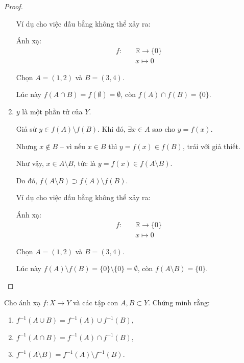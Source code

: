 \documentclass[class=linearalgebra,crop=false]{standalone}
\begin{document}
\begin{proof}
\begin{enumerate}[label = (\alph*)]
        \bigskip
        \par Ví dụ cho việc dấu bằng không thể xảy ra:
        \par Ánh xạ:
        \begin{align*}
            f:\quad& \mathbb{R}\rightarrow \{0\} \\
                   & x\mapsto 0
        \end{align*}
        \par Chọn $A = (1, 2)$ và $B = (3, 4)$.
        \par Lúc này $f(A\cap B) = f(\emptyset) = \emptyset$, còn $f(A)\cap f(B) = \{ 0 \}$.

        \item $y$ là một phần tử của $Y$.

        \par Giả sử $y\in f(A)\setminus f(B)$. Khi đó, $\exists x\in A$ sao cho $y = f(x)$.
        \par Nhưng $x\not\in B$ -- vì nếu $x\in B$ thì $y = f(x)\in f(B)$, trái với giả thiết.
        \par Như vậy, $x\in A\setminus B$, tức là $y = f(x)\in f(A\setminus B)$.
        \par Do đó, $f(A\setminus B)\supset f(A)\setminus f(B)$.

        \bigskip
        \par Ví dụ cho việc dấu bằng không thể xảy ra:
        \par Ánh xạ:
        \begin{align*}
            f:\quad& \mathbb{R}\rightarrow \{0\} \\
                   & x\mapsto 0
        \end{align*}
        \par Chọn $A = (1, 2)$ và $B = (3, 4)$.
        \par Lúc này $f(A)\setminus f(B) = \{0\}\setminus \{0\} = \emptyset$, còn $f(A\setminus B) = \{ 0 \}$.
    \end{enumerate}
\end{proof}

\begin{exercise}Cho ánh xạ $f: X\rightarrow Y$ và các tập con $A, B\subset Y$. Chứng minh rằng:
    \begin{enumerate}[itemsep=0pt,label = (\alph*)]
        \item $f^{-1}(A\cup B) = f^{-1}(A)\cup f^{-1}(B)$,
        \item $f^{-1}(A\cap B) = f^{-1}(A)\cap f^{-1}(B)$,
        \item $f^{-1}(A\setminus B) = f^{-1}(A)\setminus f^{-1}(B)$.
    \end{enumerate}
\end{exercise}
\end{document}
